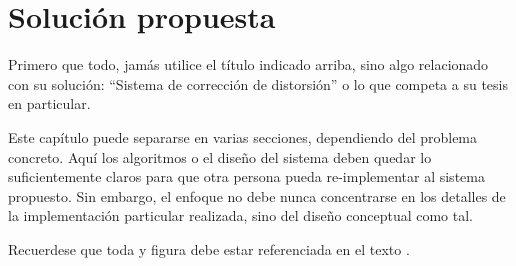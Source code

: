 \chapter{Solución propuesta}
\label{ch:solucion}

Primero que todo, jamás utilice el título indicado arriba, sino algo
relacionado con su solución: ``Sistema de corrección de distorsión'' o lo que
competa a su tesis en particular.

Este capítulo puede separarse en varias secciones, dependiendo del problema
concreto. Aquí los algoritmos o el diseño del sistema deben quedar lo
suficientemente claros para que otra persona pueda re-implementar al sistema
propuesto. Sin embargo, el enfoque no debe nunca concentrarse en los detalles
de la implementación particular realizada, sino del diseño conceptual como tal.

Recuerdese que toda \tabla{} y figura debe estar referenciada en el texto \cite{Burrus1998}.
